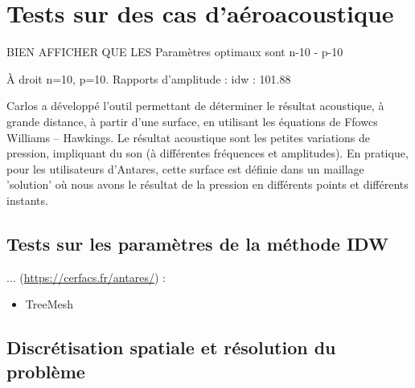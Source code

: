 




\section{Tests sur des cas d'aéroacoustique}


BIEN AFFICHER QUE LES Paramètres optimaux sont n-10 - p-10

À droit n=10, p=10. Rapports d'amplitude : idw : 101.88 %

Carlos a développé l'outil permettant de déterminer le résultat acoustique, à grande distance, à partir d'une surface, en utilisant les équations de Ffowcs Williams – Hawkings. Le résultat acoustique sont les petites variations de pression, impliquant du son (à différentes fréquences et amplitudes). En pratique, pour les utilisateurs d'Antares, cette surface est définie dans un maillage 'solution' où nous avons le résultat de la pression en différents points et différents instants.
\subsection{Tests sur les paramètres de la méthode IDW}




... (\url{https://cerfacs.fr/antares/}) : 


\begin{itemize}
    \item TreeMesh 
\end{itemize}


\subsection{Discrétisation spatiale et résolution du problème}